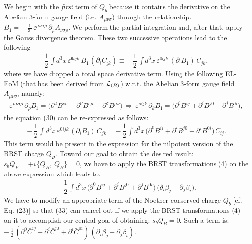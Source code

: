 \documentclass[12pt]{article}
\begin{document}
We begin with the {\it first}  term of $Q_b$ because it contains the derivative on the Abelian 3-form
gauge field (i.e. $A_{\mu\nu\sigma} $)
through the relationship: $B_1 = -\,\frac{1}{3!}\, \varepsilon^{\mu\nu\sigma\rho} \, \partial_\mu A_{\nu\sigma\rho} $. 
We perform the partial integration
and, after that,  apply the Gauss divergence theorem. These two successive operations lead to the following
\begin{eqnarray}\label{30}
\dfrac{1}{2}\, \int d^3 x\, \varepsilon^{0ijk}\, B_1 \,(\partial_i C_{jk}) \equiv - \, 
\dfrac{1}{2}\, \int d^3 x\, \varepsilon^{0ijk}\, (\partial_i B_1) \, C_{jk},
\end{eqnarray}
where we have dropped a total space derivative term. Using the following EL-EoM (that has been derived from ${\cal L}_{(B)}$) w.r.t.
the Abelian 3-form gauge field  $A_{\mu\nu\sigma}$, namely;
\begin{eqnarray}\label{31}
 \varepsilon^{\mu\nu\sigma\rho}\, \partial_\rho B_1
= \big (\partial^\mu B^{\nu\sigma} + \partial^\nu B^{\sigma\mu}  + \partial^\sigma B^{\mu\nu} \big ) \,\Longrightarrow \,
\varepsilon^{oijk}\, \partial_k B_1
= \big (\partial^0 B^{ij} + \partial^i B^{j0}  + \partial^j B^{0i} \big ),
\end{eqnarray}
the equation (30) can be re-expressed as follows:
\begin{eqnarray}\label{32} 
- \, \dfrac{1}{2}\, \int d^3 x\, \varepsilon^{0ijk}\, (\partial_i B_1) \, C_{jk}
= - \, \dfrac{1}{2}\, \int d^3 x\, \big (\partial^0 B^{ij} + \partial^i B^{j0}  + \partial^j B^{0i} \big ) \, C_{ij}.
\end{eqnarray}
This term would be present in the expression for the nilpotent version of the BRST charge $Q_B$. Toward our goal to obtain the 
desired result: $s_b Q_B = +i\, \{Q_B, \; Q_B \} = 0 $, we have to apply the BRST transformations (4) on the above expression
which leads to:
\begin{eqnarray}\label{33} 
- \, \dfrac{1}{2}\, \int d^3 x\, \big (\partial^0 B^{ij} + \partial^i B^{j0}  + \partial^j B^{0i} \big ) \, 
\big (\partial_i \beta_j - \partial_j \beta_i \big ).
\end{eqnarray}
We have to modify an appropriate term of the Noether conserved charge $Q_b$ [cf. Eq. (23)]
so that (33) can cancel out if we apply the BRST transformations (4) on it to accomplish
our central goal of obtaining: $s_b Q_B = 0$. Such a term is:
$-\, \frac{1}{2}\,(\partial^0 \bar C^{ij} + \partial^i \bar C^{j0} + \partial^j \bar C^{0i})\,(\partial_i \beta_j - \partial_j \beta_i) $.
\end{document}
